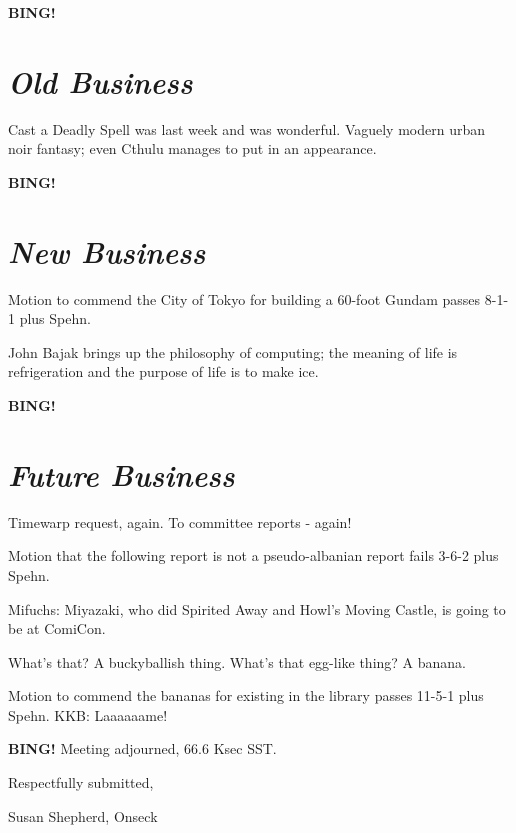 \documentclass[10pt]{article}
\newcommand{\bing}{{\bf BING!} }
\newcommand{\goto}[1]{\bing \vskip 12pt \section*{{\em{#1}}}}
\newcommand{\ps}{ plus Spehn\xspace}
\begin{document}
\goto{Old Business}

Cast a Deadly Spell was last week and was wonderful. Vaguely modern urban noir fantasy; even Cthulu manages to put in an appearance.

\goto{New Business}

Motion to commend the City of Tokyo for building a 60-foot Gundam passes 8-1-1 \ps.

John Bajak brings up the philosophy of computing; the meaning of life is refrigeration and the purpose of life is to make ice.

\goto{Future Business}

Timewarp request, again. To committee reports - again!

Motion that the following report is not a pseudo-albanian report fails 3-6-2 \ps.

Mifuchs: Miyazaki, who did Spirited Away and Howl's Moving Castle, is going to be at ComiCon.

What's that? A buckyballish thing. What's that egg-like thing? A banana.

Motion to commend the bananas for existing in the library passes 11-5-1 \ps. KKB: Laaaaaame!



\bing
\noindent
Meeting adjourned, 66.6 Ksec SST.

\vspace{18pt}

\centerline{Respectfully submitted,}
\centerline{Susan Shepherd, Onseck}
\end{document}
